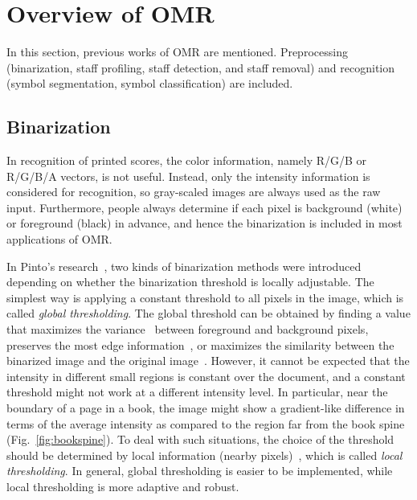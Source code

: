\chapter{Overview of OMR}
\label{c:overveiw-of-omr}

In this section, previous works of OMR are mentioned. Preprocessing (binarization, staff profiling, staff detection, and staff removal) and recognition (symbol segmentation, symbol classification) are included. 

\section{Binarization}


\graphicspath{{./figsrc/}}
\fi

In recognition of printed scores, the color information, namely R/G/B or R/G/B/A vectors, is not useful. Instead, only the intensity information is considered for recognition, so gray-scaled images are always used as the raw input. Furthermore, people always determine if each pixel is background (white) or foreground (black) in advance, and hence the binarization is included in most applications of OMR.

In Pinto's research~\cite{Pinto:2011:MSB}, two kinds of binarization methods were introduced depending on whether the binarization threshold is locally adjustable. The simplest way is applying a constant threshold to all pixels in the image, which is called \emph{global thresholding}. The global threshold can be obtained by finding a value that maximizes the variance~\cite{Otsu:1979:ATSMfGLH} between foreground and background pixels, preserves the most edge information~\cite{Chen:2008:ADTIBMboED}, or maximizes the similarity between the binarized image and the original image~\cite{Huang:1995:ITbMtMoF,Tsai:1995:AFTSPfMaUH}. However, it cannot be expected that the intensity in different small regions is constant over the document, and a constant threshold might not work at a different intensity level. In particular, near the boundary of a page in a book, the image might show a gradient-like difference in terms of the average intensity as compared to the region far from the book spine (Fig.~\ref{fig:bookspine}). To deal with such situations, the choice of the threshold should be determined by local information (nearby pixels)~\cite{Bernsen:2005:DToGLI}, which is called \emph{local thresholding}. In general, global thresholding is easier to be implemented, while local thresholding is more adaptive and robust.


